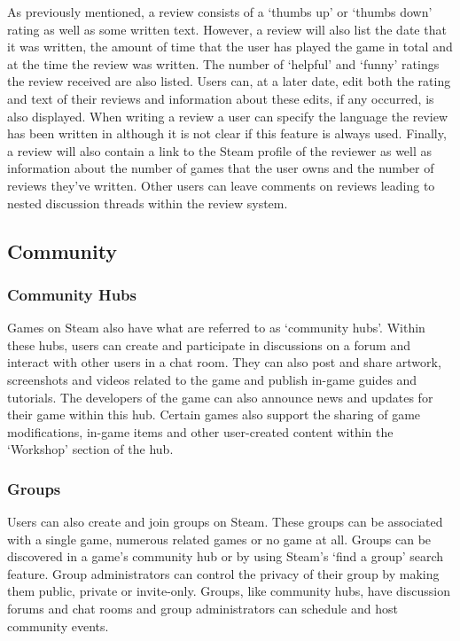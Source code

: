 As previously mentioned, a review consists of  a `thumbs up' or `thumbs down' rating as well as some written text. However, a review will also list the date that it was written, the amount of time that the user has played the game in total and at the time the review was written. The number of `helpful' and `funny' ratings the review received are also listed. Users can, at a later date, edit both the rating and text of their reviews and information about these edits, if any occurred, is also displayed. When writing a review a user can specify the language the review has been written in although it is not clear if this feature is always used. Finally, a review will also contain a link to the Steam profile of the reviewer as well as information about the number of games that the user owns and the number of reviews they've written. Other users can leave comments on reviews leading to nested discussion threads within the review system.

\subsection{Community} \label{sec:BG_Steam_Comm}

\subsubsection{Community Hubs}

Games on Steam also have what are referred to as `community hubs'. Within these hubs, users can create and participate in discussions on a forum and interact with other users in a chat room. They can also post and share artwork, screenshots and videos related to the game and publish in-game guides and tutorials. The developers of the game can also announce news and updates for their game within this hub. Certain games also support the sharing of game modifications, in-game items and other user-created content within the `Workshop' section of the hub.

\subsubsection{Groups}

Users can also create and join groups on Steam. These groups can be associated with a single game, numerous related games or no game at all. Groups can be discovered in a game's community hub or by using Steam's `find a group' search feature. Group administrators can control the privacy of their group by making them public, private or invite-only. Groups, like community hubs, have discussion forums and chat rooms and group administrators can schedule and host community events.

